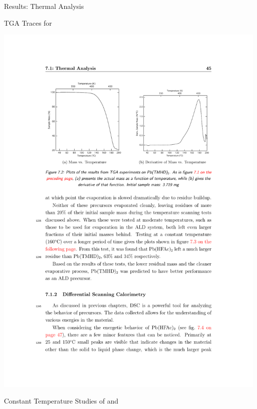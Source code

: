 \documentclass[professionalfont]{beamer}
\begin{document}
\begin{frame}{Results: Thermal Analysis}
\begin{overprint}
		\begin{center}
		TGA Traces for \\
		\vspace{0.5cm}
		\centerline{\includegraphics[width=\textwidth]{./graphics/data/tga/tmhd}}
		\end{center}
		\begin{center}
		Constant Temperature Studies of  and \\
		\vspace{0.5cm}

\end{center}
\end{overprint}
\end{frame}
\end{document}

